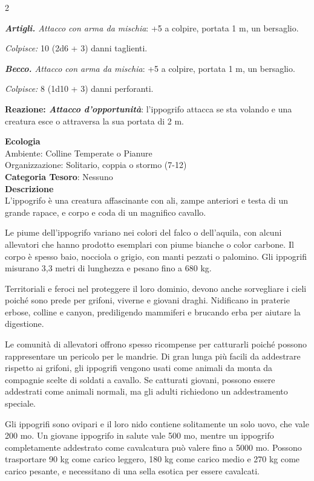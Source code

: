 \begin{multicols}{2}
{\emph{\textbf{Artigli.} Attacco con arma da mischia}: +5 a colpire, portata 1 m, un bersaglio.

\emph{Colpisce:} 10 (2d6 + 3) danni taglienti.

\emph{\textbf{Becco.} Attacco con arma da mischia}: +5 a colpire, portata 1 m, un bersaglio.

\emph{Colpisce:} 8 (1d10 + 3) danni perforanti.

\textbf{Reazione: \emph{Attacco d'opportunità}}: l'ippogrifo attacca se sta volando e una creatura esce o attraversa la sua portata di 2 m.

\textbf{Ecologia}\\
Ambiente: Colline Temperate o Pianure\\
Organizzazione: Solitario, coppia o stormo (7-12)\\
\textbf{Categoria Tesoro}: Nessuno\\
\textbf{Descrizione}\\
L'ippogrifo è una creatura affascinante con ali, zampe anteriori e testa di un grande rapace, e corpo e coda di un magnifico cavallo.

Le piume dell'ippogrifo variano nei colori del falco o dell'aquila, con alcuni allevatori che hanno prodotto esemplari con piume bianche o color carbone. Il corpo è spesso baio, nocciola o grigio, con manti pezzati o palomino. Gli ippogrifi misurano 3,3 metri di lunghezza e pesano fino a 680 kg.

Territoriali e feroci nel proteggere il loro dominio, devono anche sorvegliare i cieli poiché sono prede per grifoni, viverne e giovani draghi. Nidificano in praterie erbose, colline e canyon, prediligendo mammiferi e brucando erba per aiutare la digestione.

Le comunità di allevatori offrono spesso ricompense per catturarli poiché possono rappresentare un pericolo per le mandrie. Di gran lunga più facili da addestrare rispetto ai grifoni, gli ippogrifi vengono usati come animali da monta da compagnie scelte di soldati a cavallo. Se catturati giovani, possono essere addestrati come animali normali, ma gli adulti richiedono un addestramento speciale.

Gli ippogrifi sono ovipari e il loro nido contiene solitamente un solo uovo, che vale 200 mo. Un giovane ippogrifo in salute vale 500 mo, mentre un ippogrifo completamente addestrato come cavalcatura può valere fino a 5000 mo. Possono trasportare 90 kg come carico leggero, 180 kg come carico medio e 270 kg come carico pesante, e necessitano di una sella esotica per essere cavalcati.

}
\end{multicols}

